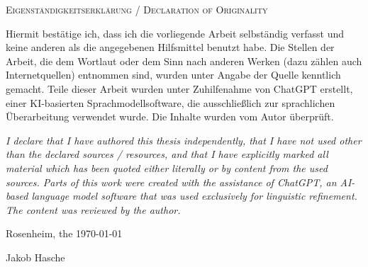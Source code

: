 {
\large
\thispagestyle{empty}
\vspace*{\fill}

\noindent
\textsc{Eigenständigkeitserklärung / Declaration of Originality}

\medskip

\noindent
Hiermit bestätige ich, dass ich die vorliegende Arbeit selbständig verfasst und keine anderen als die angegebenen Hilfsmittel benutzt habe. Die Stellen der Arbeit, die dem Wortlaut oder dem Sinn nach anderen Werken (dazu zählen auch Internetquellen) entnommen sind, wurden unter Angabe der Quelle kenntlich gemacht. Teile dieser Arbeit wurden unter Zuhilfenahme von ChatGPT erstellt, einer KI-basierten Sprachmodellsoftware, die ausschließlich zur sprachlichen Überarbeitung verwendet wurde. Die Inhalte wurden vom Autor überprüft.

\medskip

\textit{I declare that I have authored this thesis independently, that I have not used other than the declared sources / resources, and that I have explicitly marked all material which has been quoted either literally or by content from the used sources. Parts of this work were created with the assistance of ChatGPT, an AI-based language model software that was used exclusively for linguistic refinement. The content was reviewed by the author.}

\bigskip

\noindent
Rosenheim, the \today

\vspace*{2cm}

\noindent
Jakob Hasche
}

